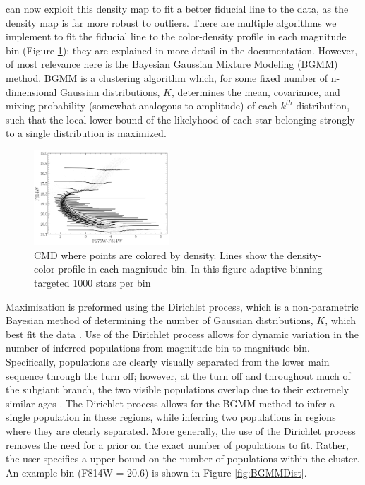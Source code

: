 \fidanka can now exploit this density map to fit a better fiducial line to the
data, as the density map is far more robust to outliers. There are multiple
algorithms we implement to fit the fiducial line to the color-density profile
in each magnitude bin (Figure \ref{densityBinsDemo}); they are explained in
more detail in the \fidanka documentation. However, of most relevance here is
the Bayesian Gaussian Mixture Modeling (BGMM) method. BGMM is a clustering
algorithm which, for some fixed number of n-dimensional Gaussian distributions,
$K$, determines the mean, covariance, and mixing probability (somewhat
analogous to amplitude) of each $k^{th}$ distribution, such that the local
lower bound of the likelyhood of each star belonging strongly to a single
distribution is maximized. 

\begin{figure}
	\centering
	\includegraphics[width=0.45\textwidth]{DensityBinsDemo.png}
	\caption{CMD where points are colored by density. Lines show the
	density-color profile in each magnitude bin. In this figure adaptive
	binning targeted 1000 stars per bin}
	\label{densityBinsDemo}
\end{figure}

Maximization is preformed using the Dirichlet process, which is a
non-parametric Bayesian method of determining the number of Gaussian
distributions, $K$, which best fit the data \citep{Ferguson1973, scikit-learn}.
Use of the Dirichlet process allows for dynamic variation in the number of
inferred populations from magnitude bin to magnitude bin. Specifically,
populations are clearly visually separated from the lower main sequence through
the turn off; however, at the turn off and throughout much of the subgiant
branch, the two visible populations overlap due to their extremely similar ages
\citep[i.e.][]{Jordan2002}. The Dirichlet process allows for the BGMM method to
infer a single population in these regions, while inferring two populations in
regions where they are clearly separated. More generally, the use of the
Dirichlet process removes the need for a prior on the exact number of
populations to fit. Rather, the user specifies a upper bound on the number of
populations within the cluster. An example bin (F814W = 20.6) is shown in
Figure \ref{fig:BGMMDist}.

